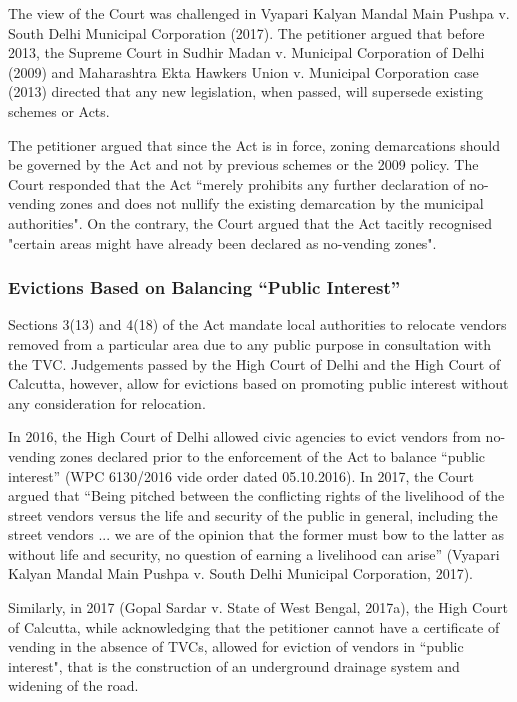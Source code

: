 \documentclass[a4paper, 12pt, twoside]{article}
\begin{document}
{The view of the Court was challenged in Vyapari Kalyan Mandal Main Pushpa v. South Delhi Municipal Corporation (2017). The petitioner argued that before 2013, the Supreme Court in Sudhir Madan v. Municipal Corporation of Delhi (2009) and Maharashtra Ekta Hawkers Union v. Municipal Corporation case (2013) directed that any new legislation, when passed, will supersede existing schemes or Acts.

The petitioner argued that since the Act is in force, zoning demarcations should be governed by the Act and not by previous schemes or the 2009 policy. The Court responded that the Act “merely prohibits any further declaration of no-vending zones and does not nullify the existing demarcation by the municipal authorities". On the contrary, the Court argued that the Act tacitly recognised "certain areas might have already been declared as no-vending zones".

\subsubsection*{Evictions Based on Balancing “Public Interest”}

Sections 3(13) and 4(18) of the Act mandate local authorities to relocate vendors removed from a particular area due to any public purpose in consultation with the TVC. Judgements passed by the High Court of Delhi and the High Court of Calcutta, however, allow for evictions based on promoting public interest without any consideration for relocation.

In 2016, the High Court of Delhi allowed civic agencies to evict vendors from no-vending zones declared prior to the enforcement of the Act to balance “public interest” (WPC 6130/2016 vide order dated 05.10.2016). In 2017, the Court argued that “Being pitched between the conflicting rights of the livelihood of the street vendors versus the life and security of the public in general, including the street vendors ... we are of the opinion that the former must bow to the latter as without life and security, no question of earning a livelihood can arise” (Vyapari Kalyan Mandal Main Pushpa v. South Delhi Municipal Corporation, 2017).

Similarly, in 2017 (Gopal Sardar v. State of West Bengal, 2017a), the High Court of Calcutta, while acknowledging that the petitioner cannot have a certificate of vending in the absence of TVCs, allowed for eviction of vendors in “public interest", that is the construction of an underground drainage system and widening of the road.

}
\end{document}
